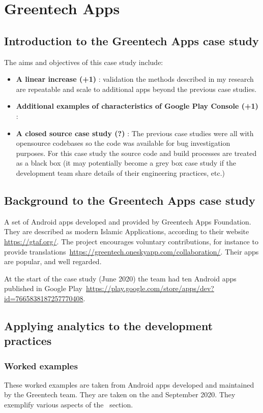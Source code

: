 \section{Greentech Apps}

\subsection{Introduction to the Greentech Apps case study}
The aims and objectives of this case study include:

\begin{itemize}
    \item \textbf{A linear increase (+1)} : validation the methods described in my research are repeatable and scale to additional apps beyond the previous case studies.
    \item \textbf{Additional examples of characteristics of Google Play Console (+1)} :
    \item \textbf{A closed source case study (?)} : The previous case studies were all with opensource codebases so the code was available for bug investigation purposes. For this case study the source code and build processes are treated as a black box (it may potentially become a grey box case study if the development team share details of their engineering practices, etc.)
\end{itemize}

\subsection{Background to the Greentech Apps case study}
A set of Android apps developed and provided by Greentech Apps Foundation. They are described as modern Islamic Applications, according to their website \url{https://gtaf.org/}. The project encourages voluntary contributions, for instance to provide translations~\url{https://greentech.oneskyapp.com/collaboration/}. Their apps are popular, and well regarded. %

At the start of the case study (June 2020) the team had ten Android apps published in Google Play~\url{https://play.google.com/store/apps/dev?id=7665838187257770408}.

\subsection{Applying analytics to the development practices}

\subsubsection{Worked examples}
These worked examples are taken from Android apps developed and maintained by the Greentech team. They are taken on the  and  September 2020. They exemplify various aspects of the~\href{section-select-aggregate-scope-analyse-triage-and-prioritise}{\MakeLowercase{\emph{}}} section. %



